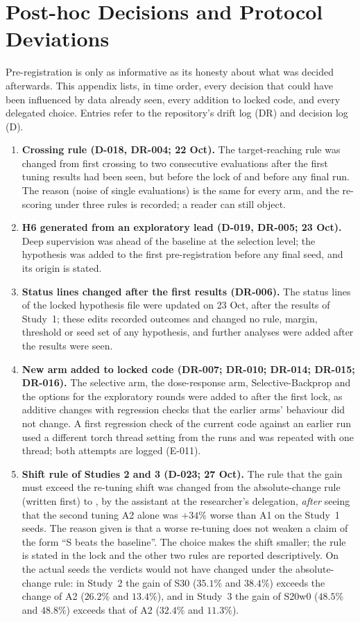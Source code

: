 \chapter{Post-hoc Decisions and Protocol Deviations}\label{app:deviations}
Pre-registration is only as informative as its honesty about what was decided afterwards. This appendix lists, in time order, every decision that could have been influenced by data already seen, every addition to locked code, and every delegated choice. Entries refer to the repository's drift log (DR) and decision log (D).

\begin{enumerate}
\item \textbf{Crossing rule (D-018, DR-004; 22 Oct).} The target-reaching rule was changed from first crossing to two consecutive evaluations after the first tuning results had been seen, but before the lock of  and before any final run. The reason (noise of single evaluations) is the same for every arm, and the re-scoring under three rules is recorded; a reader can still object.
\item \textbf{H6 generated from an exploratory lead (D-019, DR-005; 23 Oct).} Deep supervision was ahead of the baseline at the selection level; the hypothesis was added to the first pre-registration before any final seed, and its origin is stated.
\item \textbf{Status lines changed after the first results (DR-006).} The status lines of the locked hypothesis file were updated on 23 Oct, after the results of Study~1; these edits recorded outcomes and changed no rule, margin, threshold or seed set of any hypothesis, and further analyses were added after the results were seen.
\item \textbf{New arm added to locked code (DR-007; DR-010; DR-014; DR-015; DR-016).} The selective arm, the dose-response arm, Selective-Backprop and the options for the exploratory rounds were added to  after the first lock, as additive changes with regression checks that the earlier arms' behaviour did not change. A first regression check of the current code against an earlier run used a different torch thread setting from the runs and was repeated with one thread; both attempts are logged (E-011).
\item \textbf{Shift rule of Studies 2 and 3 (D-023; 27 Oct).} The rule that the gain must exceed the re-tuning shift was changed from the absolute-change rule (written first) to , by the assistant at the researcher's delegation, \emph{after} seeing that the second tuning A2 alone was $+34\%$ worse than A1 on the Study~1 seeds. The reason given is that a worse re-tuning does not weaken a claim of the form ``S beats the baseline''. The choice makes the shift smaller; the rule is stated in the lock and the other two rules are reported descriptively. On the actual seeds the verdicts would not have changed under the absolute-change rule: in Study~2 the gain of S30 ($35.1\%$ and $38.4\%$) exceeds the change of A2 ($26.2\%$ and $13.4\%$), and in Study~3 the gain of S20w0 ($48.5\%$ and $48.8\%$) exceeds that of A2 ($32.4\%$ and $11.3\%$).

\end{enumerate}
